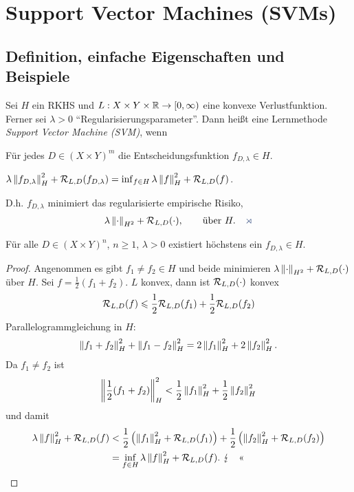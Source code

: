 \chapter{Support Vector Machines (SVMs)}

\section{Definition, einfache Eigenschaften und Beispiele}
\label{chap:6.1}

\begin{defn}
\label{defn:6.1.1}
Sei $H$ ein RKHS und $L: X\times Y \times \mathbb{R}\to [0,\infty)$ eine konvexe
Verlustfunktion. Ferner sei $\lambda > 0$ "`Regularisierungsparameter"'. Dann
heißt eine Lernmethode \emph{Support Vector Machine (SVM)}, wenn
\begin{defnenum}
\item Für jedes $D\in (X\times Y)^m$ die Entscheidungsfunktion $f_{D,\lambda}\in
H$.
\item $\lambda \left\|f_{D,\lambda}\right\|_H^2 + \mathcal{R}_{L,D}(f_{D,\lambda}) = \inf_{f\in
H} \lambda \left\|f\right\|_H^2 + \mathcal{R}_{L,D}(f)$.
\end{defnenum}
D.h. $f_{D,\lambda}$ minimiert das regularisierte empirische Risiko,
\begin{align*}
\lambda \norm{\cdot}_{H^2} + \RR_{L,D}(\cdot),\qquad \text{über }H.\fishhere
\end{align*}
\end{defn}

\begin{lem}[Eindeutigkeit]
\label{lem:6.1.2}
Für alle $D\in (X\times Y)^n$, $n\ge 1$, $\lambda > 0$ existiert höchstens ein
$f_{D,\lambda}\in H$.\fishhere
\end{lem}
\begin{proof}
Angenommen es gibt $f_1\neq f_2\in H$ und beide minimieren 
$\lambda \left\|\cdot\right\|_{H^2} + \mathcal{R}_{L,D}(\cdot)$ über $H$. Sei
$f=\frac{1}{2}(f_1+f_2)$. $L$ konvex, dann ist $\mathcal{R}_{L,D}(\cdot)$ konvex
\begin{align*}
\mathcal{R}_{L,D}(f) \leqslant \frac{1}{2}\mathcal{R}_{L,D}(f_1) + \frac{1}{2}\mathcal{R}_{L,D}(f_2)
\end{align*}
Parallelogrammgleichung in $H$:
\begin{align*}
\left\|f_1+f_2\right\|_H^2 + \left\|f_1-f_2\right\|_H^2 = 2\left\|f_1\right\|_H^2 + 2\left\|f_2\right\|_H^2.
\end{align*}
Da $f_1\neq f_2$ ist
\begin{align*}
\left\|\frac{1}{2}(f_1+f_2)\right\|_H^2  < \frac{1}{2}\left\|f_1\right\|_H^2 +
\frac{1}{2}\left\|f_2\right\|_H^2
\end{align*}
und damit
\begin{align*}
\lambda\left\|f\right\|_H^2 + \mathcal{R}_{L,D}(f) &< 
\frac{1}{2}\left( \left\|f_1\right\|_H^2 + \mathcal{R}_{L,D}(f_1) \right)
+
\frac{1}{2}\left( \left\|f_2\right\|_H^2 + \mathcal{R}_{L,D}(f_2) \right)\\
&= \inf_{f\in H} \lambda \left\|f\right\|_H^2 + \mathcal{R}_{L,D}(f).\ \lightning\quad\text{<<}
\end{align*}
\end{proof}

